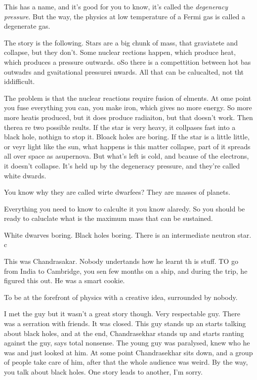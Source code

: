 This has a name,
and it's good for you to know,
it's called the
\emph{degeneracy pressure}.
But the way,
the physics at low temperature of a Fermi gas
is called a degenerate gas.

The story is the following.
Stars are a big chunk of mass,
that graviatete and collapse,
but they don't.
Some nuclear rections happen,
which produce heat,
which produces a pressure outwards.
oSo there is a compettition between hot bas outwadrs and gvaitational pressurei
nwards.
All that can be calucalted,
not tht iddifficult.

The problem is that the nuclear reactions require fusion of elments.
At ome point you fuse everything you can,
you make iron,
which gives no more energy.
So more more heatis produced,
but it does produce radiaiton,
but that doesn't work.
Then therea re two possible rsults.
If the star is very heavy,
it collpases fast into a black hole,
nothign to stop it.
Bloack holes are boring.
If the star is a little little,
or veyr light like the sun,
what happens is this matter collapse,
part of it spreads all over space as asupernova.
But what's left is cold,
and bcause of the electrons,
it doesn't collapse.
It's held up by the degeneracy pressure,
and they're called white dwards.

You know why they are called wirte dwarfees?
They are masses of planets.

Everything you need to know to calculte it you know alaredy.
So you should be ready to caluclate what is the maximum mass that can be
sustained.

White dwarves boring.
Black holes boring.
There is an intermediate neutron star.
c

This was Chandrasakar.
Nobody undertands how he learnt th is stuff.
TO go from India to Cambridge,
you sen  few months on a ship,
and during the trip,
he figured this out.
He was a smart cookie.

To be at the forefront of physics with a creative idea,
surrounded by nobody.

I met the guy but it wasn't a great story though.
Very respectable guy.
There was a serration with friends.
It was closed.
This guy stands up an starts talking about black holes,
and at the end,
Chandrasekhar stands up and starts ranting against the guy,
says total nonsense.
The young guy was paralysed,
knew who he was and just looked at him.
At some point Chandrasekhar sits down,
and a group of people take care of him,
after that the whole audience was weird.
By the way,
you talk about black holes.
One story leads to another,
I'm sorry.

